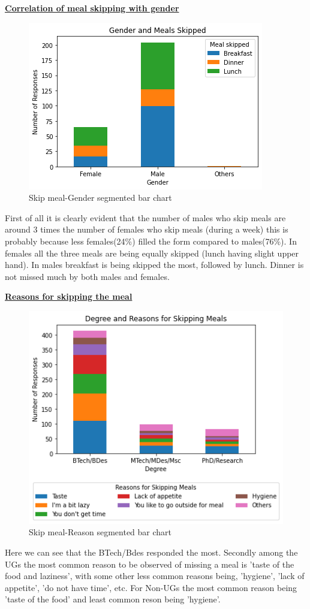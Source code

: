 \documentclass{article}
\begin{document}
\centerline{\underline{\bfseries{Correlation of meal skipping with gender}}}

\begin{figure}[H]
    \centering
    \includegraphics[scale = 0.7]{Meal Skipping - Gender Seg chart.png}
    \caption{Skip meal-Gender segmented bar chart}  
    \label{fig:Normality_plot}
\end{figure}
First of all it is clearly evident that the number of males who skip meals are around 3 times the number of females who skip meals (during a week) this is probably because less females(24\%) filled the form compared to males(76\%). In females all the three meals are being equally skipped (lunch having slight upper hand). In males breakfast is being skipped the most, followed by lunch. Dinner is not missed much by both males and females.
\pagebreak

\centerline{\underline{\bfseries{Reasons for skipping the meal}}}

\begin{figure}[H]
    \centering
    \includegraphics[scale = 0.7]{Meal Skipping - Reason Seg chart.png}
    \caption{Skip meal-Reason segmented bar chart}  
    \label{fig:Normality_plot}
\end{figure}
Here we can see that the BTech/Bdes responded the most. Secondly among the UGs the most common reason to be observed of missing a meal is 'taste of the food and laziness', with some other less common reasons being, 'hygiene', 'lack of appetite', 'do not have time', etc. For Non-UGs the most common reason being 'taste of the food' and least common reson being 'hygiene'.\\
\end{document}
